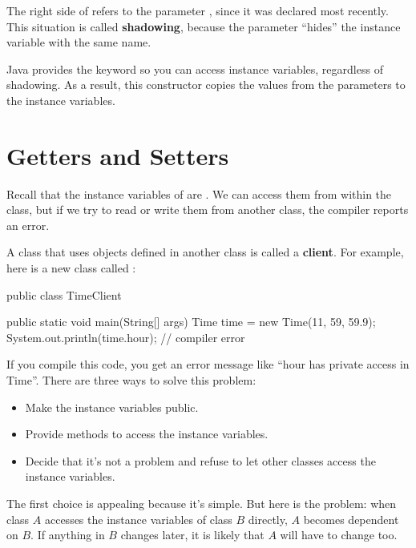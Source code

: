 
The right side of  refers to the parameter , since it was declared most recently.
This situation is called {\bf shadowing}, because the parameter ``hides'' the instance variable with the same name.

Java provides the keyword  so you can access instance variables, regardless of shadowing.
As a result, this constructor copies the values from the parameters to the instance variables.


\section{Getters and Setters}

Recall that the instance variables of  are .
We can access them from within the  class, but if we try to read or write them from another class, the compiler reports an error.


A class that uses objects defined in another class is called a {\bf client}.
For example, here is a new class called :


\begin{code}
public class TimeClient {

    public static void main(String[] args) {
        Time time = new Time(11, 59, 59.9);
        System.out.println(time.hour);      // compiler error
    }
}
\end{code}

If you compile this code, you get an error message like ``hour has private access in Time''.
There are three ways to solve this problem:

\begin{itemize}

\item Make the instance variables public.

\item Provide methods to access the instance variables.

\item Decide that it's not a problem and refuse to let other classes access the instance variables.

\end{itemize}

The first choice is appealing because it's simple.
But here is the problem: when class $A$ accesses the instance variables of class $B$ directly, $A$ becomes dependent on $B$.
If anything in $B$ changes later, it is likely that $A$ will have to change too.

